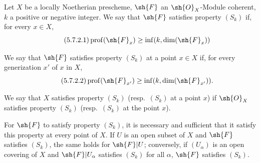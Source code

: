 \begin{definition}[5.7.2]
\label{IV.5.7.2}
Let $X$ be a locally Noetherian prescheme, $\sh{F}$ an $\sh{O}_X$-Module coherent, $k$ a positive or negative integer.
We say that $\sh{F}$ satisfies property $(S_k)$ if, for every $x\in X$,
\[
\tag{5.7.2.1}\label{IV.5.7.2.1}
  \operatorname{prof}(\sh{F}_x) \geq \inf(k, \dim(\sh{F}_x))
\]

We say that $\sh{F}$ satisfies property $(S_k)$ at a point $x\in X$ if, for every generization $x'$ of $x$ in $X$,
\[
\tag{5.7.2.2}\label{IV.5.7.2.2}
  \operatorname{prof}(\sh{F}_{x'}) \geq \inf(k, \dim(\sh{F}_{x'})).
\]

We say that $X$ satisfies property $(S_k)$ (resp.\ $(S_k)$ at a point $x$) if $\sh{O}_X$ satisfies property $(S_k)$ (resp.\ $(S_k)$ at the point $x$).

For $\sh{F}$ to satisfy property $(S_k)$, it is necessary and sufficient that it satisfy this property at every point of $X$.
If $U$ is an open subset of $X$ and $\sh{F}$ satisfies $(S_k)$, the same holds for $\sh{F}|U$; conversely, if $(U_\alpha)$ is an open covering of $X$ and $\sh{F}|U_\alpha$ satisfies $(S_k)$ for all $\alpha$, $\sh{F}$ satisfies $(S_k)$.
\end{definition}

